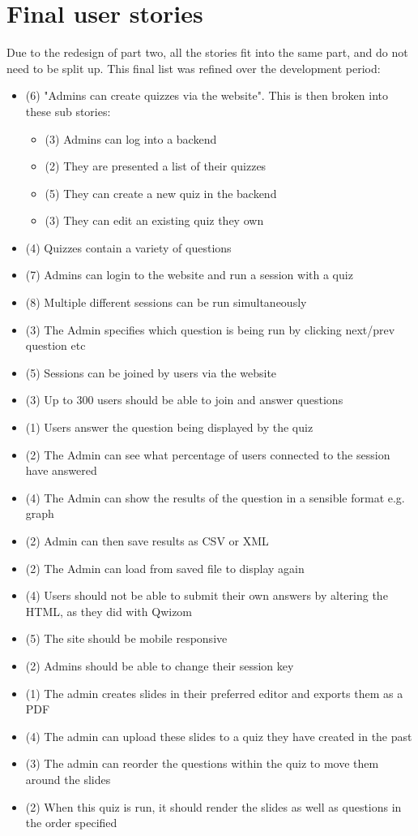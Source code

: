 \newpage

\section{Final user stories}
Due to the redesign of part two, all the stories fit into the same part, and do not need to be split up. This final list was refined over the development period:
\begin{itemize}
	\item (6) "Admins can create quizzes via the website". This is then broken into these sub stories:
	\begin{itemize}
		\item (3) Admins can log into a backend
		\item (2) They are presented a list of their quizzes
		\item (5) They can create a new quiz in the backend
		\item (3) They can edit an existing quiz they own
	\end{itemize}
	\item (4) Quizzes contain a variety of questions
	\item (7) Admins can login to the website and run a session with a quiz
	\item (8) Multiple different sessions can be run simultaneously
	\item (3) The Admin specifies which question is being run by clicking next/prev question etc
	\item (5) Sessions can be joined by users via the website
	\item (3) Up to 300 users should be able to join and answer questions
	\item (1) Users answer the question being displayed by the quiz
	\item (2) The Admin can see what percentage of users connected to the session have answered
	\item (4) The Admin can show the results of the question in a sensible format e.g. graph
	\item (2) Admin can then save results as CSV or XML
	\item (2) The Admin can load from saved file to display again
	\item (4) Users should not be able to submit their own answers by altering the HTML, as they did with Qwizom
	\item (5) The site should be mobile responsive
	\item (2) Admins should be able to change their session key
	\item (1) The admin creates slides in their preferred editor and exports them as a PDF
	\item (4) The admin can upload these slides to a quiz they have created in the past
	\item (3) The admin can reorder the questions within the quiz to move them around the slides
	\item (2) When this quiz is run, it should render the slides as well as questions in the order specified
\end{itemize}